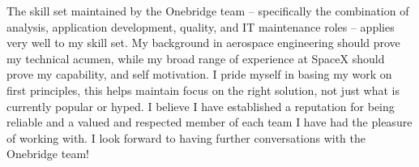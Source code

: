 \begin{cvletter}

The skill set maintained by the Onebridge team -- specifically the combination
of analysis, application development, quality, and IT maintenance roles --
applies very well to my skill set. My background in aerospace engineering should
prove my technical acumen, while my broad range of experience at SpaceX should
prove my capability, and self motivation. I pride myself in basing my work on
first principles, this helps maintain focus on the right solution, not just what
is currently popular or hyped. I believe I have established a reputation for
being reliable and a valued and respected member of each team I have had the
pleasure of working with. I look forward to having further conversations with
the Onebridge team!


\end{cvletter}

